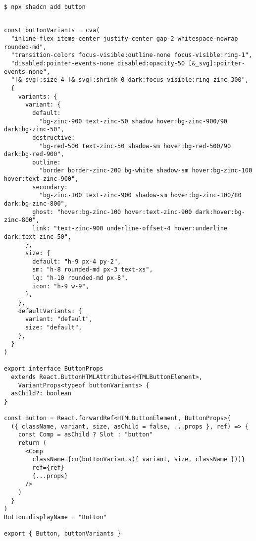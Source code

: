 \begin{verbatim}
$ npx shadcn add button
\end{verbatim}

\begin{verbatim}

const buttonVariants = cva(
  "inline-flex items-center justify-center gap-2 whitespace-nowrap rounded-md",
  "transition-colors focus-visible:outline-none focus-visible:ring-1",
  "disabled:pointer-events-none disabled:opacity-50 [&_svg]:pointer-events-none",
  "[&_svg]:size-4 [&_svg]:shrink-0 dark:focus-visible:ring-zinc-300",
  {
    variants: {
      variant: {
        default:
          "bg-zinc-900 text-zinc-50 shadow hover:bg-zinc-900/90 dark:bg-zinc-50",
        destructive:
          "bg-red-500 text-zinc-50 shadow-sm hover:bg-red-500/90 dark:bg-red-900",
        outline:
          "border border-zinc-200 bg-white shadow-sm hover:bg-zinc-100 hover:text-zinc-900",
        secondary:
          "bg-zinc-100 text-zinc-900 shadow-sm hover:bg-zinc-100/80 dark:bg-zinc-800",
        ghost: "hover:bg-zinc-100 hover:text-zinc-900 dark:hover:bg-zinc-800",
        link: "text-zinc-900 underline-offset-4 hover:underline dark:text-zinc-50",
      },
      size: {
        default: "h-9 px-4 py-2",
        sm: "h-8 rounded-md px-3 text-xs",
        lg: "h-10 rounded-md px-8",
        icon: "h-9 w-9",
      },
    },
    defaultVariants: {
      variant: "default",
      size: "default",
    },
  }
)

export interface ButtonProps
  extends React.ButtonHTMLAttributes<HTMLButtonElement>,
    VariantProps<typeof buttonVariants> {
  asChild?: boolean
}

const Button = React.forwardRef<HTMLButtonElement, ButtonProps>(
  ({ className, variant, size, asChild = false, ...props }, ref) => {
    const Comp = asChild ? Slot : "button"
    return (
      <Comp
        className={cn(buttonVariants({ variant, size, className }))}
        ref={ref}
        {...props}
      />
    )
  }
)
Button.displayName = "Button"

export { Button, buttonVariants }
\end{verbatim}
